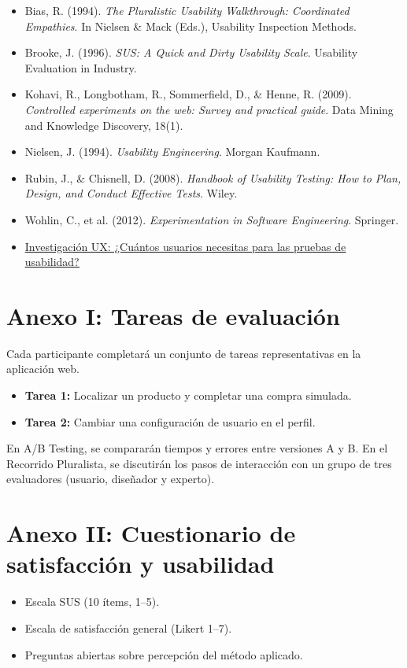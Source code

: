 \documentclass[a4paper,12pt]{report}
\begin{document}
\begin{itemize}
    \item Bias, R. (1994). \textit{The Pluralistic Usability Walkthrough: Coordinated Empathies}. In Nielsen \& Mack (Eds.), Usability Inspection Methods.
    \item Brooke, J. (1996). \textit{SUS: A Quick and Dirty Usability Scale}. Usability Evaluation in Industry.
    \item Kohavi, R., Longbotham, R., Sommerfield, D., \& Henne, R. (2009). \textit{Controlled experiments on the web: Survey and practical guide}. Data Mining and Knowledge Discovery, 18(1).
    \item Nielsen, J. (1994). \textit{Usability Engineering}. Morgan Kaufmann.
    \item Rubin, J., \& Chisnell, D. (2008). \textit{Handbook of Usability Testing: How to Plan, Design, and Conduct Effective Tests}. Wiley.
    \item Wohlin, C., et al. (2012). \textit{Experimentation in Software Engineering}. Springer.
    \item \href{https://tldv.io/es/blog/ux-research-how-many-users-do-you-need-for-usability-testing/}{\uline{Investigación UX: ¿Cuántos usuarios necesitas para las pruebas de usabilidad?}}
\end{itemize}

\cleardoublepage

\printbibliography[heading=bibintoc,title={Bibliografía}]
\appendix

\chapter{Anexo I: Tareas de evaluación}
Cada participante completará un conjunto de tareas representativas en la aplicación web.  
\begin{itemize}
    \item \textbf{Tarea 1:} Localizar un producto y completar una compra simulada.  
    \item \textbf{Tarea 2:} Cambiar una configuración de usuario en el perfil.  
\end{itemize}
En A/B Testing, se compararán tiempos y errores entre versiones A y B.  
En el Recorrido Pluralista, se discutirán los pasos de interacción con un grupo de tres evaluadores (usuario, diseñador y experto).

\chapter{Anexo II: Cuestionario de satisfacción y usabilidad}
\begin{itemize}
    \item Escala SUS (10 ítems, 1--5).  
    \item Escala de satisfacción general (Likert 1--7).  
    \item Preguntas abiertas sobre percepción del método aplicado.  
\end{itemize}
\end{document}
